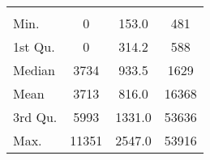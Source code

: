 \begin{tabular}{lS[table-format=5.1]S[table-format=5.1]S[table-format=5.1]}
&  &  &  \\
 Min.    & 0 & 153.0 & 481 \\
 1st Qu. & 0 & 314.2 & 588 \\
 Median  & 3734 & 933.5 & 1629 \\
 Mean    & 3713 & 816.0 & 16368 \\
 3rd Qu. & 5993 & 1331.0 & 53636 \\
 Max.    & 11351 & 2547.0 & 53916 \\
\end{tabular}
